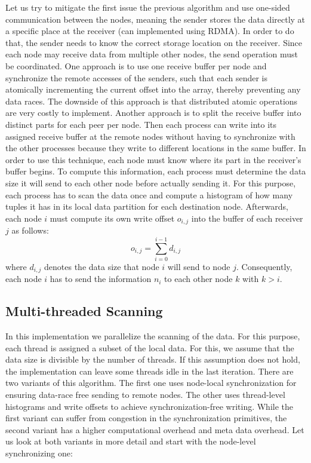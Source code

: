 Let us try to mitigate the first issue the previous algorithm and use one-sided communication between the nodes, meaning the sender stores the data directly at a specific place at the receiver (can implemented using RDMA).
In order to do that, the sender needs to know the correct storage location on the receiver.
Since each node may receive data from multiple other nodes, the send operation must be coordinated.
One approach is to use one receive buffer per node and synchronize the remote accesses of the senders, such that each sender is atomically incrementing the current offset into the array, thereby preventing any data races.
The downside of this approach is that distributed atomic operations are very costly to implement.
Another approach is to split the receive buffer into distinct parts for each peer per node.
Then each process can write into its assigned receive buffer at the remote nodes without having to synchronize with the other processes because they write to different locations in the same buffer.
In order to use this technique, each node must know where its part in the receiver's buffer begins.
To compute this information, each process must determine the data size it will send to each other node before actually sending it.
For this purpose, each process has to scan the data once and compute a histogram of how many tuples it has in its local data partition for each destination node.
Afterwards, each node $i$ must compute its own write offset $o_{i,j}$ into the buffer of each receiver $j$ as follows:
$$
o_{i,j} = \sum_{i=0}^{i-1}d_{i,j}
$$
where $d_{i,j}$ denotes the data size that node $i$ will send to node $j$.
Consequently, each node $i$ has to send the information $n_i$ to each other node $k$ with $k > i$.

\subsection{Multi-threaded Scanning}

In this implementation we parallelize the scanning of the data.
For this purpose, each thread is assigned a subset of the local data.
For this, we assume that the data size is divisible by the number of threads.
If this assumption does not hold, the implementation can leave some threads idle in the last iteration.
There are two variants of this algorithm.
The first one uses node-local synchronization for ensuring data-race free sending to remote nodes.
The other uses thread-level histograms and write offsets to achieve synchronization-free writing.
While the first variant can suffer from congestion in the synchronization primitives, the second variant has a higher computational overhead and meta data overhead.
Let us look at both variants in more detail and start with the node-level synchronizing one:

